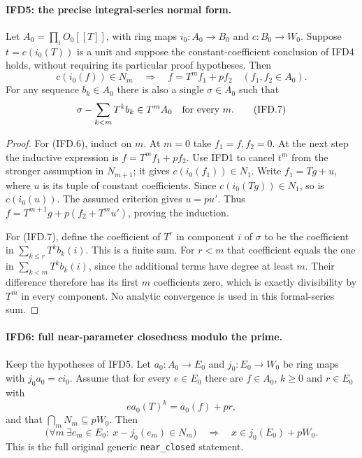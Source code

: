 \documentclass[11pt,a4paper]{article}
\numberwithin{equation}{section}
\theoremstyle{remark}\newtheorem{remark}[theorem]{Remark}
\begin{document}
\paragraph{IFD5: the precise integral-series normal form.}
\label{claim:IFD5}
Let $A_0=\prod_iO_0[[T]]$, with ring maps $i_0:A_0\to B_0$ and
$c:B_0\to W_0$. Suppose $t=c(i_0(T))$ is a unit and suppose the
constant-coefficient conclusion of IFD4 holds, without requiring its
particular proof hypotheses. Then
\[
 c(i_0(f))\in N_m\quad\Longrightarrow\quad
                   f=T^mf_1+pf_2\quad(f_1,f_2\in A_0).        \tag{IFD.6}
\]
For any sequence $b_k\in A_0$ there is also a single $\sigma\in A_0$
such that
\[
             \sigma-\sum_{k<m}T^kb_k\in T^mA_0
                                  \quad\hbox{for every }m.  \tag{IFD.7}
\]

\begin{proof}
For (IFD.6), induct on $m$. At $m=0$ take $f_1=f,f_2=0$.
At the next step the inductive expression is $f=T^mf_1+pf_2$.
Use IFD1 to cancel $t^m$ from the stronger assumption in $N_{m+1}$;
it gives $c(i_0(f_1))\in N_1$. Write $f_1=Tg+u$, where $u$ is
its tuple of constant coefficients. Since $c(i_0(Tg))\in N_1$,
so is $c(i_0(u))$. The assumed criterion gives $u=pu'$.
Thus $f=T^{m+1}g+p(f_2+T^mu')$, proving the induction.

For (IFD.7), define the coefficient of $T^r$ in component $i$ of
$\sigma$ to be the coefficient in $\sum_{k\leq r}T^kb_k(i)$.
This is a finite sum. For $r<m$ that coefficient equals the one in
$\sum_{k<m}T^kb_k(i)$, since the additional terms have degree at
least $m$. Their difference therefore has its first $m$ coefficients
zero, which is exactly divisibility by $T^m$ in every component.
No analytic convergence is used in this formal-series sum.
\end{proof}

\paragraph{IFD6: full near-parameter closedness modulo the prime.}
\label{claim:IFD6}
Keep the hypotheses of IFD5. Let $a_0:A_0\to E_0$ and
$j_0:E_0\to W_0$ be ring maps with $j_0a_0=ci_0$.
Assume that for every $e\in E_0$ there are $f\in A_0$, $k\geq0$
and $r\in E_0$ with
\[
                     e a_0(T)^k=a_0(f)+pr,                 \tag{IFD.8}
\]
and that $\bigcap_mN_m\subseteq pW_0$. Then
\[
 \bigl(\forall m\ \exists e_m\in E_0:\ x-j_0(e_m)\in N_m\bigr)
          \quad\Longrightarrow\quad x\in j_0(E_0)+pW_0.    \tag{IFD.9}
\]
This is the full original generic \texttt{near\_\allowbreak closed} statement.
\end{document}

